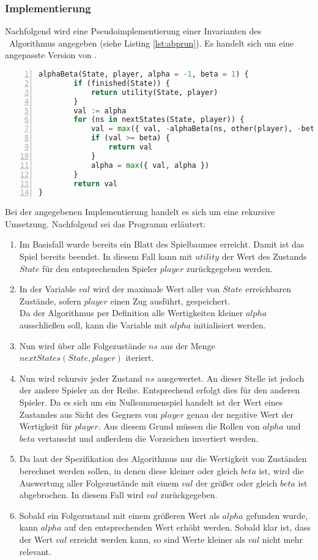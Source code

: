 \subsubsection{Implementierung}
\label{ab-basics-impl}
Nachfolgend wird eine Pseudoimplementierung einer Invarianten des \abab\ Algorithmus angegeben (siehe Listing \ref{lst:abprun}). Es handelt sich um eine angepasste Version von \cite{StroetmannAI19}.
\begin{lstlisting}[caption = {Pseudoimplementierung von \abab}, language = python, captionpos = t , numbers=left, label={lst:abprun}]
alphaBeta(State, player, alpha = -1, beta = 1) {
        if (finished(State)) {
            return utility(State, player)
        }
        val := alpha
        for (ns in nextStates(State, player)) {
            val = max({ val, -alphaBeta(ns, other(player), -beta, -alpha) })
            if (val >= beta) {
                return val
            }
            alpha = max({ val, alpha })
        }
        return val
}
\end{lstlisting}
Bei der angegebenen Implementierung handelt es sich um eine rekursive Umsetzung. Nachfolgend sei das Programm erläutert:
\begin{enumerate}
\item Im Basisfall wurde bereits ein Blatt des Spielbaumes erreicht. Damit ist das Spiel bereits beendet. In diesem Fall kann mit $utility$ der Wert des Zustands $State$ für den entsprechenden Spieler $player$ zurückgegeben werden.
\item In der Variable $val$ wird der maximale Wert aller von $State$ erreichbaren Zustände, sofern $player$ einen Zug ausführt, gespeichert.\\
Da der Algorithmus per Definition alle Wertigkeiten kleiner $alpha$ ausschließen soll, kann die Variable mit $alpha$ initialisiert werden.
\item Nun wird über alle Folgezustände $ns$ aus der Menge $nextStates(State, player)$ iteriert.
\item Nun wird rekursiv jeder Zustand $ns$ ausgewertet. An dieser Stelle ist jedoch der andere Spieler an der Reihe. Entsprechend erfolgt dies für den anderen Spieler. Da es sich um ein Nullsummenspiel handelt ist der Wert eines Zustandes aus Sicht des Gegners von $player$ genau der negative Wert der Wertigkeit für $player$. Aus diesem Grund müssen die Rollen von $alpha$ und $beta$ vertauscht und außerdem die Vorzeichen invertiert werden.
\item Da laut der Spezifikation des Algorithmus nur die Wertigkeit von Zuständen berechnet werden sollen, in denen diese kleiner oder gleich $beta$ ist, wird die Auswertung aller Folgezustände mit einem $val$ der größer oder gleich $beta$ ist abgebrochen. In diesem Fall wird $val$ zurückgegeben.
\item Sobald ein Folgezustand mit einem größeren Wert als $alpha$ gefunden wurde, kann $alpha$ auf den entsprechenden Wert erhöht werden. Sobald klar ist, dass der Wert $val$ erreicht werden kann, so sind Werte kleiner als $val$ nicht mehr relevant.  
 
\end{enumerate}

